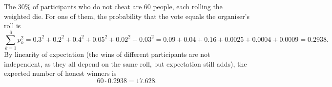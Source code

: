 The $30\%$ of participants who do not cheat are $60$ people, each rolling the weighted die. For one of them, the probability that the vote equals the organiser's roll is
\[\sum_{k=1}^6p_k^2=0.3^2+0.2^2+0.4^2+0.05^2+0.02^2+0.03^2=0.09+0.04+0.16+0.0025+0.0004+0.0009=0.2938.\]
By linearity of expectation (the wins of different participants are not independent, as they all depend on the same roll, but expectation still adds), the expected number of honest winners is
\[60\cdot0.2938=\boxed{17.628}.\]
